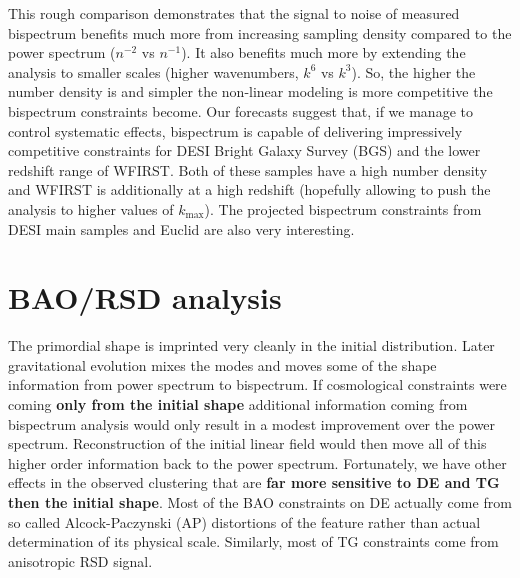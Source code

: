 This rough comparison demonstrates that the signal to noise of measured
bispectrum benefits much more from increasing sampling density  compared to
the power spectrum ($n^{-2}$ vs $n^{-1}$). It also benefits much more by
extending the analysis to smaller scales (higher wavenumbers, $k^6$ vs
$k^3$). So, the higher the number density is and simpler the non-linear
modeling is more competitive the bispectrum constraints become. Our forecasts
suggest that, if we manage to control systematic effects, bispectrum is capable
of delivering impressively competitive constraints for DESI Bright Galaxy
Survey (BGS) and the lower redshift range of WFIRST. Both of these samples have
a high number density and WFIRST is additionally at a high redshift (hopefully
allowing to push the analysis to higher values of $k_\mathrm{max}$). The
projected bispectrum constraints from DESI main samples and Euclid are also
very interesting.

\section{BAO/RSD analysis}

The primordial shape is imprinted very cleanly in the initial distribution.
Later gravitational evolution mixes the modes and moves some of the shape
information from power spectrum to bispectrum. If cosmological constraints were
coming \textbf{only from the initial shape} additional information coming from
bispectrum analysis would only result in a modest improvement over the power
spectrum.  Reconstruction of the initial linear field would then move all of
this higher order information back to the power spectrum. Fortunately, we have
other effects in the observed clustering that are \textbf{far more sensitive to
DE and TG then the initial shape}. Most of the BAO constraints on DE actually
come from so called Alcock-Paczynski (AP) distortions of the feature rather
than actual determination of its physical scale. Similarly, most of TG
constraints come from anisotropic RSD signal.

